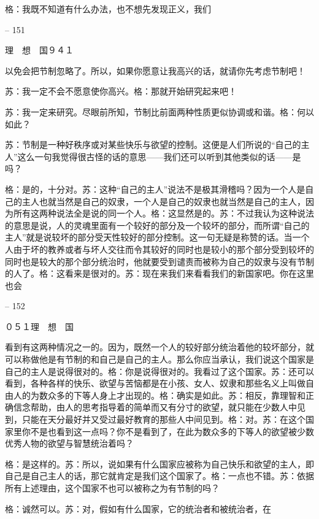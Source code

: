 \documentclass[11pt,oneside]{book}
\begin{document}
\begin{common-format}
    格：我既不知道有什么办法，也不想先发现正义，我们

    

-- 151

    理　想　国９４１

    以免会把节制忽略了。所以，如果你愿意让我高兴的话，就请你先考虑节制吧！

    苏：我一定不会不愿意使你高兴。格：那就开始研究起来吧！

    苏：我一定来研究。尽眼前所知，节制比前面两种性质更似协调或和谐。格：何以如此？

    苏：节制是一种好秩序或对某些快乐与欲望的控制。这便是人们所说的“自己的主人”这么一句我觉得很古怪的话的意思——我们还可以听到其他类似的话——是吗？

    格：是的，十分对。苏：这种“自己的主人”说法不是极其滑稽吗？因为一个人是自己的主人也就当然是自己的奴隶，一个人是自己的奴隶也就当然是自己的主人，因为所有这两种说法全是说的同一个人。格：这显然是的。苏：不过我认为这种说法的意思是说，人的灵魂里面有一个较好的部分及一个较坏的部分，而所谓“自己的主人”就是说较坏的部分受天性较好的部分控制。这一句无疑是称赞的话。当一个人由于坏的教养或者与坏人交往而令其较好的同时也是较小的那个部分受到较坏的同时也是较大的那个部分统治时，他就要受到谴责而被称为自己的奴隶与没有节制的人了。格：这看来是很对的。苏：现在来我们来看看我们的新国家吧。你在这里也会

    

-- 152

    ０５１理　想　国

    看到有这两种情况之一的。因为，既然一个人的较好部分统治着他的较坏部分，就可以称做他是有节制的和自己是自己的主人。那么你应当承认，我们说这个国家是自己的主人是说得很对的。格：你是说得很对的。我看过了这个国家。苏：还可以看到，各种各样的快乐、欲望与苦恼都是在小孩、女人、奴隶和那些名义上叫做自由人的为数众多的下等人身上才出现的。格：确实是如此。苏：相反，靠理智和正确信念帮助，由人的思考指导着的简单而又有分寸的欲望，就只能在少数人中见到，只能在天分最好并又受过最好教育的那些人中间见到。格：对。苏：在这个国家里你不是也看到这一点吗？你不是看到了，在此为数众多的下等人的欲望被少数优秀人物的欲望与智慧统治着吗？

    格：是这样的。苏：所以，说如果有什么国家应被称为自己快乐和欲望的主人，即自己是自己主人的话，那它就肯定是我们这个国家了。格：一点也不错。苏：依据所有上述理由，这个国家不也可以被称之为有节制的吗？

    格：诚然可以。苏：对，假如有什么国家，它的统治者和被统治者，在

    


\end{common-format}
\end{document}
